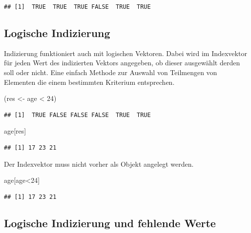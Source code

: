 \documentclass[
]{book}
\newenvironment{Shaded}{\begin{snugshade}}{\end{snugshade}}
\newcommand{\DecValTok}[1]{\textcolor[rgb]{0.00,0.00,0.81}{#1}}
\newcommand{\NormalTok}[1]{#1}
\newcommand{\OtherTok}[1]{\textcolor[rgb]{0.56,0.35,0.01}{#1}}
\newcommand{\SpecialCharTok}[1]{\textcolor[rgb]{0.00,0.00,0.00}{#1}}
\begin{document}
\begin{verbatim}
## [1]  TRUE  TRUE  TRUE FALSE  TRUE  TRUE
\end{verbatim}

\hypertarget{logische-indizierung}{%
\subsection{Logische Indizierung}\label{logische-indizierung}}

Indizierung funktioniert auch mit logischen Vektoren. Dabei wird im Indexvektor für jeden Wert des indizierten Vektors angegeben, ob dieser ausgewählt derden soll oder nicht.
Eine einfach Methode zur Auswahl von Teilmengen von Elementen die einem bestimmten Kriterium entsprechen.

\begin{Shaded}
\begin{Highlighting}[]
\NormalTok{(res }\OtherTok{\textless{}{-}}\NormalTok{ age }\SpecialCharTok{\textless{}} \DecValTok{24}\NormalTok{)}
\end{Highlighting}
\end{Shaded}

\begin{verbatim}
## [1]  TRUE FALSE FALSE FALSE  TRUE  TRUE
\end{verbatim}

\begin{Shaded}
\begin{Highlighting}[]
\NormalTok{age[res]}
\end{Highlighting}
\end{Shaded}

\begin{verbatim}
## [1] 17 23 21
\end{verbatim}

Der Indexvektor muss nicht vorher als Objekt angelegt werden.

\begin{Shaded}
\begin{Highlighting}[]
\NormalTok{age[age}\SpecialCharTok{\textless{}}\DecValTok{24}\NormalTok{]}
\end{Highlighting}
\end{Shaded}

\begin{verbatim}
## [1] 17 23 21
\end{verbatim}

\hypertarget{logische-indizierung-und-fehlende-werte}{%
\subsection{Logische Indizierung und fehlende Werte}\label{logische-indizierung-und-fehlende-werte}}
\end{document}
